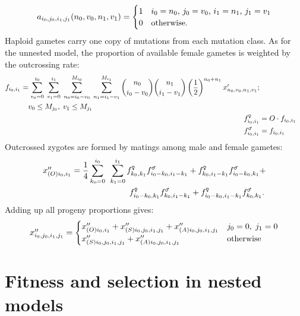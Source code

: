 \documentclass[12pt,twoside,letterpaper,fleqn]{report}
\numberwithin{equation}{section}  %
\newcommand{\Mjzero}{\mbox{$M_{j_0}$\/}}
\newcommand{\Mjone}{\mbox{$M_{j_1}$\/}}
\newcommand{\gamii}{\mbox{$f_{i_0,i_1}$}}
\newcommand{\gammaleii}{\mbox{$f_{i_0,i_1}^{\text{\Male}}$}}
\newcommand{\gamfemaleii}{\mbox{$f_{i_0,i_1}^{\text{\Female}}$}}
\newcommand{\gammalekk}{\mbox{$f_{k_0,k_1}^{\text{\Male}}$}}
\newcommand{\gamfemalekk}{\mbox{$f_{k_0,k_1}^{\text{\Female}}$}}
\newcommand{\gammaleikik}{\mbox{$f_{i_0-k_0,i_1-k_1}^{\text{\Male}}$}}
\newcommand{\gamfemaleikik}{\mbox{$f_{i_0-k_0,i_1-k_1}^{\text{\Female}}$}}
\newcommand{\gammalekik}{\mbox{$f_{k_0,i_1-k_1}^{\text{\Male}}$}}
\newcommand{\gamfemalekik}{\mbox{$f_{k_0,i_1-k_1}^{\text{\Female}}$}}
\newcommand{\gammaleikk}{\mbox{$f_{i_0-k_0,k_1}^{\text{\Male}}$}}
\newcommand{\gamfemaleikk}{\mbox{$f_{i_0-k_0,k_1}^{\text{\Female}}$}}
\newcommand{\xpnvnv}{\mbox{$x'_{n_0\/,v_0\/,n_1\/,v_1\/}$}}
\newcommand{\xppsijij}{\mbox{$x''_{(S)i_0\/,j_0\/,i_1\/,j_1\/}$}}
\newcommand{\xppaijij}{\mbox{$x''_{(A)i_0\/,j_0\/,i_1\/,j_1\/}$}}
\newcommand{\xppoii}{\mbox{$x''_{(O)i_0\/,i_1\/}$}}
\newcommand{\xppijij}{\mbox{$x''_{i_0\/,j_0\/,i_1\/,j_1\/}$}}
\newcommand{\funcapomixisnested}{\mbox{$a_{i_0\/,j_0\/,i_1\/,j_1\/}(n_0\/,v_0\/,n_1\/,v_1\/)$}}
\begin{document}
{\begin{equation}
\label{eq:nested:a}
\funcapomixisnested = 
  \begin{cases}
    1 & \text{$i_0=n_0$, $j_0=v_0$, $i_1=n_1$, $j_1=v_1$} \\
    0 & \text{otherwise.}  
  \end{cases}
\end{equation}
Haploid gametes carry one copy of mutations from each mutation class.  As for the unnested model, the proportion of available female gametes is weighted by the outcrossing rate:
\begin{align}
\begin{split}
\gamii   &= \sum_{v_0=0}^{i_0}{
	  						\; \sum_{v_1=0}^{i_1}{
                	\; \sum_{n_0=i_0-v_0}^{M_{i_0}}{
                		\; \sum_{n_1=i_1-v_1}^{M_{i_1}}{
                      \binom{n_0}{i_0-v_0} \binom{n_1}{i_1-v_1}
                      \left(\frac{1}{2}\right)^{n_0+n_1} \xpnvnv 
              }}}} ; \\ 
              & \quad v_0 \le \Mjzero, \; v_1 \le \Mjone
\end{split} \\
\gamfemaleii &= O \cdot \gamii \\
\gammaleii &= \gamii
\end{align}
Outcrossed zygotes are formed by matings among male and female gametes:
\begin{equation}
\label{eq:nested:zygotes}
\begin{split}
\xppoii &= 
  \frac{1}{4}
    \sum_{k_0=0}^{i_0}{} \;
      \sum_{k_1=0}^{i_1}{}
        \gamfemalekk\gammaleikik + \gamfemalekik\gammaleikk + \\
    &   \qquad\qquad\qquad\quad \gamfemaleikk\gammalekik + \gamfemaleikik\gammalekk.
\end{split}
\end{equation}
Adding up all progeny proportions gives:
\begin{equation}
\xppijij = 
\begin{cases}
\xppoii + \xppsijij + \xppaijij  & j_0=0,\;j_1=0 \\
\xppsijij + \xppaijij            & \text{otherwise}
\end{cases}
\end{equation}

\section{Fitness and selection in nested models}

}
\end{document}
